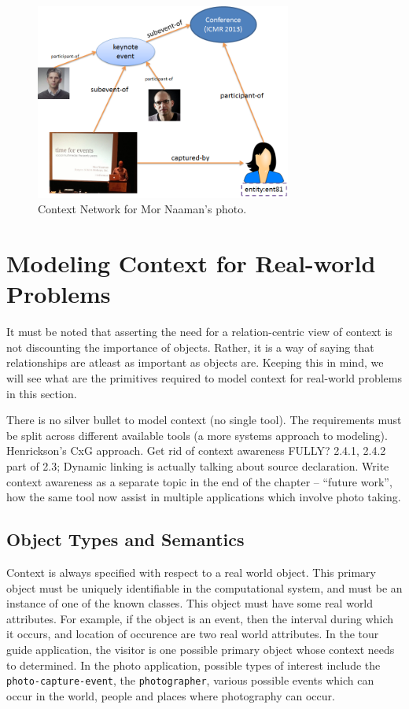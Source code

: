 \begin{figure}[h]
\centering
\includegraphics[width=0.75\textwidth]{media/chapter2/naaman-4.png}
\caption{Context Network for Mor Naaman's photo.}
\label{fig:context-network}
\end{figure}

\section{Modeling Context for Real-world Problems}

It must be noted that asserting the need for a relation-centric view of context is not discounting the importance of objects. Rather, it is a way of saying that relationships are atleast as important as objects are. Keeping this in mind, we will see what are the primitives required to model context for real-world problems in this section.

There is no silver bullet to model context (no single tool). The requirements must be split across different available tools (a more systems approach to modeling). Henrickson's CxG approach. Get rid of context awareness FULLY? 2.4.1, 2.4.2 part of 2.3; Dynamic linking is actually talking about source declaration. Write context awareness as a separate topic in the end of the chapter -- ``future work'', how the same tool now assist in multiple applications which involve photo taking.

\subsection{Object Types and Semantics}

Context is always specified with respect to a real world object. This primary object must be uniquely identifiable in the computational system, and must be an instance of one of the known classes. This object must have some real world attributes. For example, if the object is an event, then the interval during which it occurs, and location of occurence are two real world attributes. In the tour guide application, the visitor is one possible primary object whose context needs to determined. In the photo application, possible types of interest include the \texttt{photo-capture-event}, the \texttt{photographer}, various possible events which can occur in the world, people and places where photography can occur.

